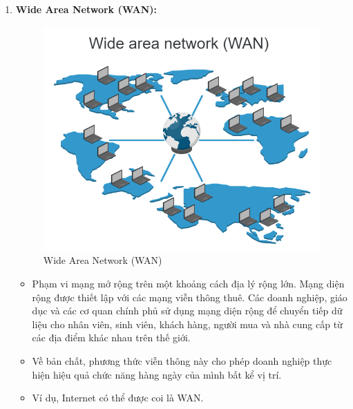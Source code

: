 \documentclass[13pt]{article}
\begin{document}
\begin{enumerate}
    \item \textbf{Wide Area Network (WAN):}
    \begin{figure}[h!]
        \centering
        \includegraphics[width=0.7\linewidth]{image/image4.png}
            \caption{Wide Area Network (WAN)}
            \label{fig:label1}
    \end{figure}
    \begin{itemize}
        \item Phạm vi mạng mở rộng trên một khoảng cách địa lý rộng lớn. Mạng diện rộng được thiết lập với các mạng viễn thông thuê. Các doanh nghiệp, giáo dục và các cơ quan chính phủ sử dụng mạng diện rộng để chuyển tiếp dữ liệu cho nhân viên, sinh viên, khách hàng, người mua và nhà cung cấp từ các địa điểm khác nhau trên thế giới.
        \item Về bản chất, phương thức viễn thông này cho phép doanh nghiệp thực hiện hiệu quả chức năng hàng ngày của mình bất kể vị trí.
        \item Ví dụ, Internet có thể được coi là WAN.
    \end{itemize}      
\end{enumerate}
\end{document}

